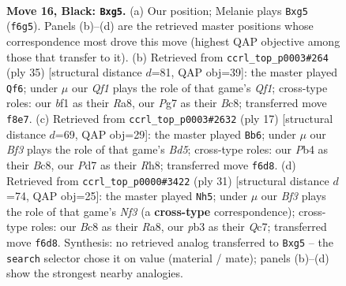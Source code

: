 \documentclass[11pt]{article}
\begin{document}
\clearpage

\begin{figure}[p]\centering
\begin{subfigure}{0.46\textwidth}\centering
\resizebox{\linewidth}{!}{%
\newchessgame
\chessboard[
  setfen={1rb2qk1/p1pp1ppp/3n1b2/6P1/1p1P4/NP6/P1P2P1P/1RBQ1BK1 b - - 0 16},
  showmover=false,
  pgfstyle=straightmove, color=movearrow, markmove={f6-g5}
]}
\caption{}
\end{subfigure}\hfill
\begin{subfigure}{0.46\textwidth}\centering
\resizebox{\linewidth}{!}{%
\newchessgame
\chessboard[
  setfen={r1b2qk1/p1p1p1bp/1p2p1p1/3Pn3/2PB4/2N5/PP1QB1PP/R5K1 b - - 1 18},
  showmover=false,
  pgfstyle=straightmove, color=movearrow, markmove={f8-f6}
]}
\caption{}
\end{subfigure}
\\[4pt]
\begin{subfigure}{0.46\textwidth}\centering
\resizebox{\linewidth}{!}{%
\newchessgame
\chessboard[
  setfen={r1bqk2r/p1p1nppp/2pp4/8/N2bP3/2PB4/PP3PPP/R1BQK2R b KQkq - 0 9},
  showmover=false,
  pgfstyle=straightmove, color=movearrow, markmove={d4-b6}
]}
\caption{}
\end{subfigure}\hfill
\begin{subfigure}{0.46\textwidth}\centering
\resizebox{\linewidth}{!}{%
\newchessgame
\chessboard[
  setfen={r1b3k1/2q1bppp/p1p2n2/1p2p1P1/4P2P/2N1BP1B/PPP2Q2/2K4R b - - 0 16},
  showmover=false,
  pgfstyle=straightmove, color=movearrow, markmove={f6-h5}
]}
\caption{}
\end{subfigure}
\caption{\textbf{Move 16, Black: \texttt{Bxg5}.} (a) Our position; Melanie plays \texttt{Bxg5} (\texttt{f6g5}). Panels (b)--(d) are the retrieved master positions whose correspondence most drove this move (highest QAP objective among those that transfer to it). (b) Retrieved from \texttt{ccrl\_top\_p0003\#264} (ply 35) [structural distance $d$=81, QAP obj=39]: the master played \texttt{Qf6}; under $\mu$ our \emph{Qf1} plays the role of that game's \emph{Qf1}; cross-type roles: our \emph{b}f1 as their \emph{R}a8, our \emph{P}g7 as their \emph{B}c8; transferred move \texttt{f8e7}. (c) Retrieved from \texttt{ccrl\_top\_p0003\#2632} (ply 17) [structural distance $d$=69, QAP obj=29]: the master played \texttt{Bb6}; under $\mu$ our \emph{Bf3} plays the role of that game's \emph{Bd5}; cross-type roles: our \emph{P}b4 as their \emph{B}c8, our \emph{P}d7 as their \emph{R}h8; transferred move \texttt{f6d8}. (d) Retrieved from \texttt{ccrl\_top\_p0000\#3422} (ply 31) [structural distance $d$=74, QAP obj=25]: the master played \texttt{Nh5}; under $\mu$ our \emph{Bf3} plays the role of that game's \emph{Nf3} (a \textbf{cross-type} correspondence); cross-type roles: our \emph{B}c8 as their \emph{R}a8, our \emph{p}b3 as their \emph{Q}c7; transferred move \texttt{f6d8}. Synthesis: no retrieved analog transferred to \texttt{Bxg5} -- the \texttt{search} selector chose it on value (material / mate); panels (b)--(d) show the strongest nearby analogies.}
\label{fig:thought-m31}
\end{figure}
\end{document}
